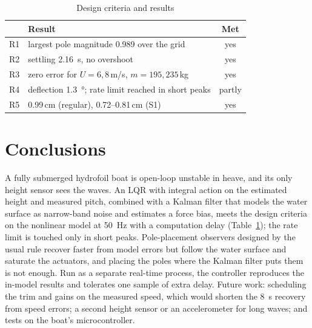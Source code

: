 \documentclass[conference]{IEEEtran}
\begin{document}
\begin{table}[t]
\centering
\caption{Design criteria and results}
\label{tab:summary}
\small
\begin{tabular}{@{}lp{5.4cm}c@{}}
\toprule
 & Result & Met \\ \midrule
R1 & largest pole magnitude 0.989 over the grid & yes \\
R2 & settling \SI{2.16}{s}, no overshoot & yes \\
R3 & zero error for $U=6,8$\,\si{m/s}, $m=195,235$\,\si{kg} & yes \\
R4 & deflection \SI{1.3}{\degree}; rate limit reached in short peaks & partly \\
R5 & 0.99\,cm (regular), 0.72--0.81\,cm (S1) & yes \\
\bottomrule
\end{tabular}
\end{table}

\section{Conclusions}
\label{sec:concl}

A fully submerged hydrofoil boat is open-loop unstable in heave, and its only
height sensor sees the waves. An LQR with integral action on the estimated
height and measured pitch, combined with a Kalman filter that models the water
surface as narrow-band noise and estimates a force bias, meets the design
criteria on the nonlinear model at \SI{50}{Hz} with a computation delay
(Table~\ref{tab:summary}); the rate limit is touched only in short peaks.
Pole-placement observers designed by the usual rule recover faster from model
errors but follow the water surface and saturate the actuators, and placing
the poles where the Kalman filter puts them is not enough. Run as a separate
real-time process, the controller reproduces the in-model results and tolerates
one sample of extra delay. Future work: scheduling the trim and gains on the
measured speed, which would shorten the \SI{8}{s} recovery from speed errors;
a second height sensor or an accelerometer for long waves; and tests on the
boat's microcontroller.
\end{document}
